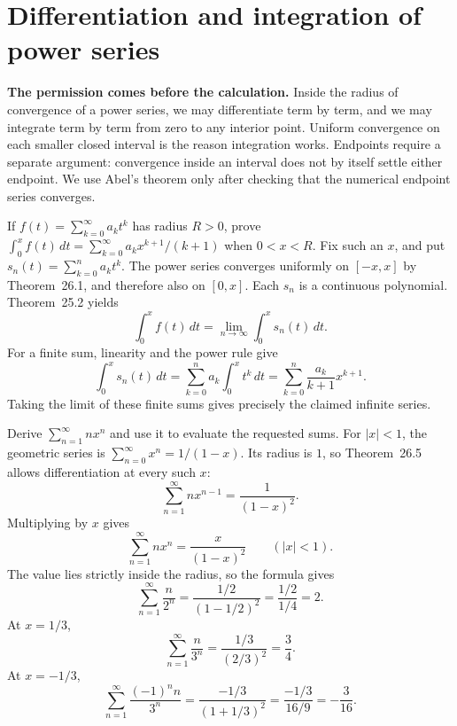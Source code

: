 \section{Differentiation and integration of power series}
\label{sec:power-calculus-new}
\textbf{The permission comes before the calculation.}
Inside the radius of convergence of a power series, we may differentiate
term by term, and we may integrate term by term from zero to any interior
point. Uniform convergence on each smaller closed interval is the reason
integration works. Endpoints require a separate argument: convergence inside
an interval does not by itself settle either endpoint. We use Abel's theorem
only after checking that the numerical endpoint series converges.

\goal If $f(t)=\sum_{k=0}^\infty a_kt^k$ has radius $R>0$, prove
$\int_0^x f(t)\,dt=\sum_{k=0}^\infty a_kx^{k+1}/(k+1)$ when $0<x<R$.
Fix such an $x$, and put $s_n(t)=\sum_{k=0}^n a_kt^k$.
The power series converges uniformly on $[-x,x]$ by Theorem~26.1, and
therefore also on $[0,x]$. Each $s_n$ is a continuous polynomial.
Theorem~25.2 yields
\[
 \int_0^x f(t)\,dt=\lim_{n\to\infty}\int_0^x s_n(t)\,dt.
\]
For a finite sum, linearity and the power rule give
\[
 \int_0^x s_n(t)\,dt
 =\sum_{k=0}^n a_k\int_0^x t^k\,dt
 =\sum_{k=0}^n \frac{a_k}{k+1}x^{k+1}.
\]
Taking the limit of these finite sums gives precisely the claimed infinite series.

\goal Derive $\sum_{n=1}^\infty nx^n$ and use it to evaluate the requested sums.
For $|x|<1$, the geometric series is
$\sum_{n=0}^\infty x^n=1/(1-x)$.
Its radius is $1$, so Theorem~26.5 allows differentiation at every such $x$:
\[
 \sum_{n=1}^\infty nx^{n-1}=\frac1{(1-x)^2}.
\]
Multiplying by $x$ gives
\[
 \boxed{\sum_{n=1}^\infty nx^n=\frac{x}{(1-x)^2}}
 \qquad(|x|<1).
\]
The value lies strictly inside the radius, so the formula gives
\[
 \sum_{n=1}^\infty\frac n{2^n}
 =\frac{1/2}{(1-1/2)^2}=\frac{1/2}{1/4}=2.
\]
At $x=1/3$,
\[
 \sum_{n=1}^\infty\frac n{3^n}
 =\frac{1/3}{(2/3)^2}=\frac34.
\]
At $x=-1/3$,
\[
 \sum_{n=1}^\infty\frac{(-1)^n n}{3^n}
 =\frac{-1/3}{(1+1/3)^2}
 =\frac{-1/3}{16/9}=-\frac3{16}.
\]

